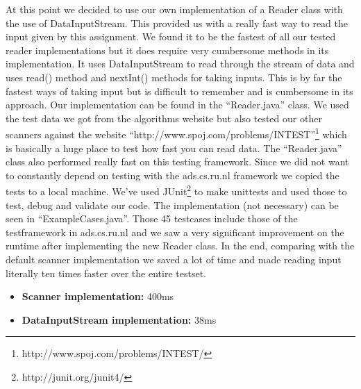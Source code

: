 \documentclass{article}
\begin{document}
At this point we decided to use our own implementation of a Reader class with the use of DataInputStream. This provided us with a really fast way to read the input given by this assignment. We found it to be the fastest of all our tested reader implementations but it does require very cumbersome methods in its implementation. It uses DataInputStream to read through the stream of data and uses read() method and nextInt() methods for taking inputs. This is by far the fastest ways of taking input but is difficult to remember and is cumbersome in its approach. Our implementation can be found in the ``Reader.java'' class. We used the test data we got from the algorithms website but also tested our other scanners against the website ``http://www.spoj.com/problems/INTEST''\footnote{\label{note1}http://www.spoj.com/problems/INTEST/} which is basically a huge place to test how fast you can read data. The ``Reader.java'' class also performed really fast on this testing framework.
\newline
\newline
Since we did not want to constantly depend on testing with the ads.cs.ru.nl framework we copied the tests to a local machine. We've used JUnit\footnote{\label{note2}http://junit.org/junit4/} to make unittests and used those to test, debug and validate our code. The implementation (not necessary) can be seen in ``ExampleCases.java''. Those 45 testcases include those of the testframework in ads.cs.ru.nl and we saw a very significant improvement on the runtime after implementing the new Reader class. In the end, comparing with the default scanner implementation we saved a lot of time and made reading input literally ten times faster over the entire testset.
\begin{itemize}
\item \textbf{Scanner implementation:} 400ms
\item \textbf{DataInputStream implementation:} 38ms
\end{itemize}
\end{document}
